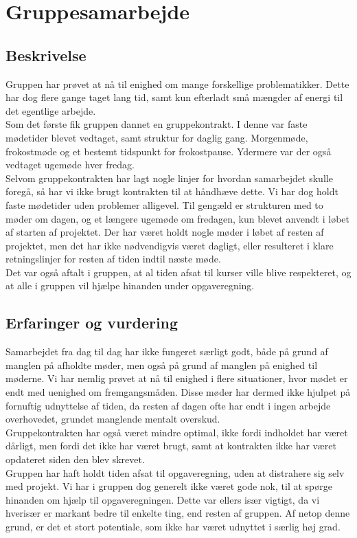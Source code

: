 \documentclass[11pt]{article}
\begin{document}
\section{Gruppesamarbejde}
\subsection{Beskrivelse}
Gruppen har prøvet at nå til enighed om mange forskellige problematikker. Dette har dog flere gange taget lang tid, samt kun efterladt små mængder af energi til det egentlige arbejde.\\
Som det første fik gruppen dannet en gruppekontrakt. I denne var faste mødetider blevet vedtaget, samt struktur for daglig gang. Morgenmøde, frokostmøde og et bestemt tidspunkt for frokostpause. Ydermere var der også vedtaget ugemøde hver fredag.\\
Selvom gruppekontrakten har lagt nogle linjer for hvordan samarbejdet skulle foregå, så har vi ikke brugt kontrakten til at håndhæve dette. Vi har dog holdt faste mødetider uden problemer alligevel. Til gengæld er strukturen med to møder om dagen, og et længere ugemøde om fredagen, kun blevet anvendt i løbet af starten af projektet. Der har været holdt nogle møder i løbet af resten af projektet, men det har ikke nødvendigvis været dagligt, eller resulteret i klare retningslinjer for resten af tiden indtil næste møde.\\
Det var også aftalt i gruppen, at al tiden afsat til kurser ville blive respekteret, og at alle i gruppen vil hjælpe hinanden under opgaveregning.

\subsection{Erfaringer og vurdering}
Samarbejdet fra dag til dag har ikke fungeret særligt godt, både på grund af manglen på afholdte møder, men også på grund af manglen på enighed til møderne. Vi har nemlig prøvet at nå til enighed i flere situationer, hvor mødet er endt med uenighed om fremgangsmåden. Disse møder har dermed ikke hjulpet på fornuftig udnyttelse af tiden, da resten af dagen ofte har endt i ingen arbejde overhovedet, grundet manglende mentalt overskud.\\
Gruppekontrakten har også været mindre optimal, ikke fordi indholdet har været dårligt, men fordi det ikke har været brugt, samt at kontrakten ikke har været opdateret siden den blev skrevet.\\
Gruppen har haft holdt tiden afsat til opgaveregning, uden at distrahere sig selv med projekt. Vi har i gruppen dog generelt ikke været gode nok, til at spørge hinanden om hjælp til opgaveregningen. Dette var ellers især vigtigt, da vi hverisær er markant bedre til enkelte ting, end resten af gruppen. Af netop denne grund, er det et stort potentiale, som ikke har været udnyttet i særlig høj grad.
\end{document}
